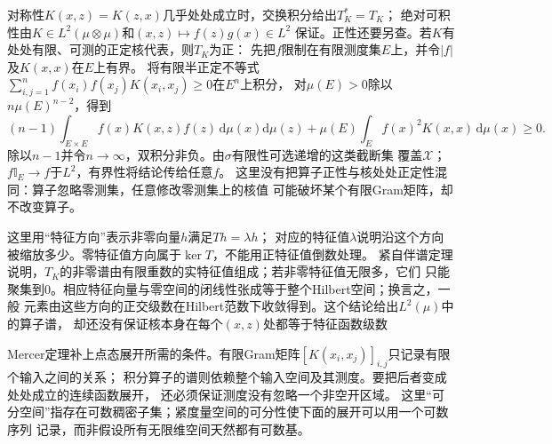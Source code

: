 对称性$K(x,z)=K(z,x)$几乎处处成立时，交换积分给出$T_K^*=T_K$；
绝对可积性由$K\in L^2(\mu\otimes\mu)$和$(x,z)\mapsto f(z)g(x)\in L^2$
保证。正性还要另查。若$K$有处处有限、可测的正定核代表，则$T_K$为正：
先把$f$限制在有限测度集$E$上，并令$|f|$及$K(x,x)$在$E$上有界。
将有限半正定不等式
$\sum_{i,j=1}^n f(x_i)f(x_j)K(x_i,x_j)\geq0$在$E^n$上积分，
对$\mu(E)>0$除以$n\mu(E)^{n-2}$，得到
\[
 (n-1)\int_{E\times E}f(x)K(x,z)f(z)\,\mathrm d\mu(x)\mathrm d\mu(z)
 +\mu(E)\int_E f(x)^2K(x,x)\,\mathrm d\mu(x)\geq0.
\]
除以$n-1$并令$n\to\infty$，双积分非负。由$\sigma$有限性可选递增的这类截断集
覆盖$\mathcal X$；$f\mathbb I_E\to f$于$L^2$，有界性将结论传给任意$f$。
这里没有把算子正性与核处处正定性混同：算子忽略零测集，任意修改零测集上的核值
可能破坏某个有限Gram矩阵，却不改变算子。

这里用“特征方向”表示非零向量$h$满足$Th=\lambda h$；
对应的特征值$\lambda$说明沿这个方向被缩放多少。零特征值方向属于$\ker T$，不能用正特征值倒数处理。
紧自伴谱定理说明，$T_K$的非零谱由有限重数的实特征值组成；若非零特征值无限多，它们
只能聚集到$0$。相应特征向量与零空间的闭线性张成等于整个Hilbert空间；换言之，一般
元素由这些方向的正交级数在Hilbert范数下收敛得到。这个结论给出$L^2(\mu)$中的算子谱，
却还没有保证核本身在每个$(x,z)$处都等于特征函数级数

Mercer定理补上点态展开所需的条件。有限Gram矩阵$[K(x_i,x_j)]_{i,j}$只记录有限个输入之间的关系；
积分算子的谱则依赖整个输入空间及其测度。要把后者变成处处成立的连续函数展开，
还必须保证测度没有忽略一个非空开区域。
这里“可分空间”指存在可数稠密子集；紧度量空间的可分性使下面的展开可以用一个可数序列
记录，而非假设所有无限维空间天然都有可数基。

